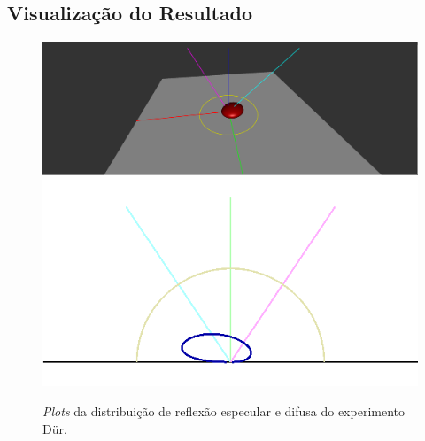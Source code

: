 \subsection{Visualização do Resultado}
\begin{figure}[H]
    \caption{\small{\textit{Plots} da distribuição de reflexão especular e difusa do experimento Dür.}}
    \label{fig-duer-plots}
    \vspace{42px}
  \includegraphics[width=\linewidth]{./Imagens/brdfs/duer-3D-plot}
\endminipage\hfill
{}
  \includegraphics[width=\linewidth]{./Imagens/brdfs/duer-polar-plot.png}
\endminipage\hfill
\end{figure}

